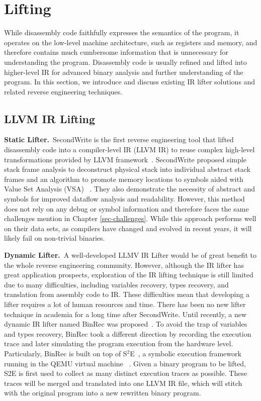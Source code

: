 \section{Lifting} \label{sec:existing-lifting}
While disassembly code faithfully expresses the semantics of the program, it 
operates on the low-level machine architecture, such as registers and memory, 
and therefore contains much cumbersome information that is unnecessary for 
understanding the program. Disassembly code is usually refined and lifted into 
higher-level IR for advanced binary analysis and further understanding of the 
program. In this section, we introduce and discuss existing IR lifter solutions 
and related reverse engineering techniques.

\subsection{LLVM IR Lifting} \label{sec:existing-llvm-lifting}
\noindent\textbf{Static Lifter.}~SecondWrite is the first reverse engineering 
tool that lifted disassembly code into a compiler-level IR (LLVM IR) to reuse 
complex high-level transformations provided by LLVM framework~\cite
{anand2013compiler,elwazeer2013scalable}.
SecondWrite proposed simple stack frame analysis to deconstruct physical stack 
into individual abstract stack frames and an algorithm to promote memory 
locations to symbols aided with Value Set Analysis (VSA)
~\cite{balakrishnan2004analyzing}.
They also demonstrate the necessity of abstract and symbols for improved 
dataflow analysis and readability.
However, this method does not rely on any debug or symbol information and 
therefore faces the same challenges mention in Chapter \ref{sec-challenges}. 
While this approach performs well on their data sets, as compilers have changed 
and evolved in recent years, it will likely fail on non-trivial binaries.

\noindent\textbf{Dynamic Lifter.}~A well-developed LLMV IR Lifter would be of 
great benefit to the whole reverse engineering community. However, although the 
IR lifter has great application prospects, exploration of the IR lifting 
technique is still limited due to many difficulties, including variables 
recovery, types recovery, and translation from assembly code to IR.
These difficulties mean that developing a lifter requires a lot of human 
resources and time. There has been no new lifter technique in academia for a 
long time after SecondWrite. Until recently, a new dynamic IR lifter named 
BinRec was proposed~\cite{altinay2020binrec}.
To avoid the trap of variables and types recovery, BinRec took a different 
direction by recording the execution trace and later simulating the program 
execution from the hardware level.
Particularly, BinRec is built on top of S$^2$E~\cite{chipounov2011s2e}, a 
symbolic execution framework running in the QEMU virtual machine
~\cite{bellard2005qemu}.
Given a binary program to be lifted, S2E is first used to collect as many 
distinct execution traces as possible. These traces will be merged and 
translated into one LLVM IR file, which will stitch with the original program 
into a new rewritten binary program.

